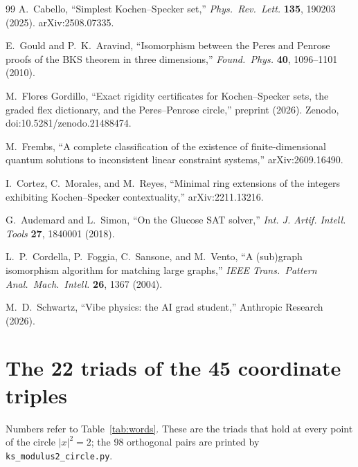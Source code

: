 \documentclass[11pt,a4paper]{article}
\theoremstyle{definition}
\theoremstyle{remark}
\begin{document}
\begin{thebibliography}{99}
A.~Cabello, ``Simplest Kochen--Specker set,''
\textit{Phys.\ Rev.\ Lett.} \textbf{135}, 190203 (2025).  arXiv:2508.07335.

E.~Gould and P.~K.~Aravind,
``Isomorphism between the Peres and Penrose proofs of the BKS theorem in three dimensions,''
\textit{Found.\ Phys.} \textbf{40}, 1096--1101 (2010).

M.~Flores Gordillo,
``Exact rigidity certificates for Kochen--Specker sets, the graded flex dictionary, and the
Peres--Penrose circle,'' preprint (2026).  Zenodo, doi:10.5281/zenodo.21488474.

M.~Frembs, ``A complete classification of the existence of finite-dimensional quantum solutions
to inconsistent linear constraint systems,'' arXiv:2609.16490.

I.~Cortez, C.~Morales, and M.~Reyes,
``Minimal ring extensions of the integers exhibiting Kochen--Specker contextuality,''
arXiv:2211.13216.

G.~Audemard and L.~Simon, ``On the Glucose SAT solver,''
\textit{Int. J. Artif. Intell. Tools} \textbf{27}, 1840001 (2018).

L.~P.~Cordella, P.~Foggia, C.~Sansone, and M.~Vento,
``A (sub)graph isomorphism algorithm for matching large graphs,''
\textit{IEEE Trans.\ Pattern Anal.\ Mach.\ Intell.} \textbf{26}, 1367 (2004).

M.~D.~Schwartz, ``Vibe physics: the AI grad student,'' Anthropic Research (2026).

\end{thebibliography}

\appendix



\section{The 22 triads of the 45 coordinate triples}\label{app:triads}
Numbers refer to Table~\ref{tab:words}.  These are the triads that hold at every point of the
circle $|x|^2=2$; the 98 orthogonal pairs are printed by \texttt{ks\_modulus2\_circle.py}.

\smallskip\noindent\raggedright

\end{document}

